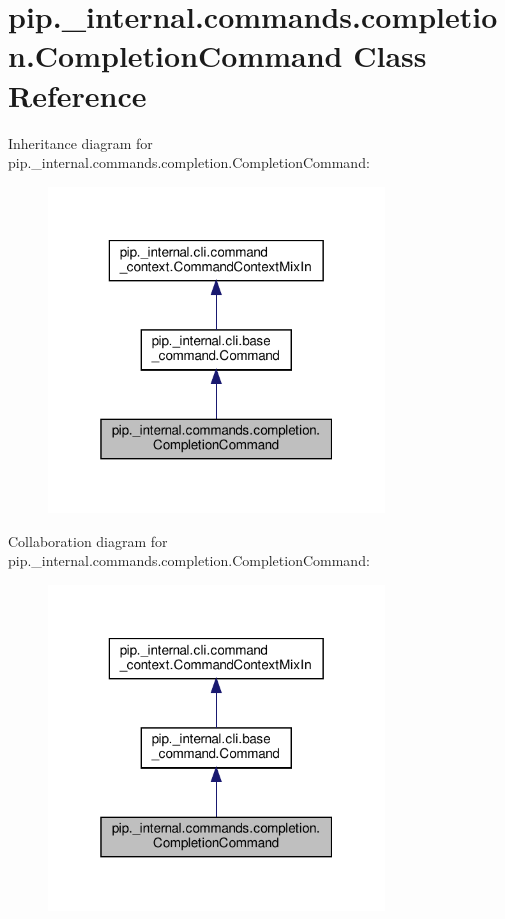 \hypertarget{classpip_1_1__internal_1_1commands_1_1completion_1_1CompletionCommand}{}\section{pip.\+\_\+internal.\+commands.\+completion.\+Completion\+Command Class Reference}
\label{classpip_1_1__internal_1_1commands_1_1completion_1_1CompletionCommand}


Inheritance diagram for pip.\+\_\+internal.\+commands.\+completion.\+Completion\+Command\+:
\nopagebreak
\begin{figure}[H]
\begin{center}
\leavevmode
\includegraphics[width=253pt]{classpip_1_1__internal_1_1commands_1_1completion_1_1CompletionCommand__inherit__graph}
\end{center}
\end{figure}


Collaboration diagram for pip.\+\_\+internal.\+commands.\+completion.\+Completion\+Command\+:
\nopagebreak
\begin{figure}[H]
\begin{center}
\leavevmode
\includegraphics[width=253pt]{classpip_1_1__internal_1_1commands_1_1completion_1_1CompletionCommand__coll__graph}
\end{center}
\end{figure}

